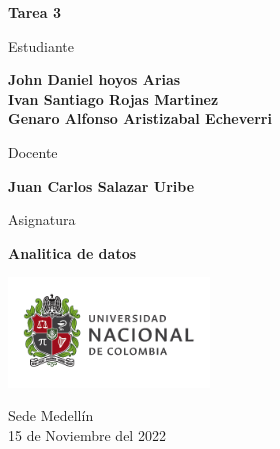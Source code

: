 \begin{titlepage}
   \Large{
   \begin{center}
       \vspace*{1cm}

       \textbf{Tarea 3}

            
       \vspace{1.1cm}
       
       Estudiante
       
       \vspace{0.5cm}
        

       \textbf{John Daniel hoyos Arias} \\

       \textbf{Ivan Santiago Rojas Martinez} \\
       
       \textbf{Genaro Alfonso Aristizabal Echeverri}




       \vspace{1cm}
       
       Docente
       
       \vspace{0.5cm}

       \textbf{Juan Carlos Salazar Uribe}
       
       \vspace{0.4cm}

       \vspace{1.4cm}
       
       Asignatura
       
       \vspace{0.5cm}

       \textbf{Analitica de datos}

       \vfill

            
       \vspace{0.4cm}
     
       \includegraphics[width=0.4\textwidth]{DocumentFormat/logounal.png}
            
       Sede Medellín\\
       15 de Noviembre del 2022
       
   \end{center}
   }
\end{titlepage}
